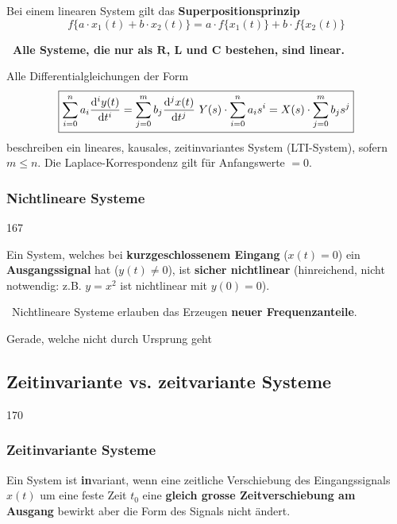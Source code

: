 Bei einem linearen System gilt das \textbf{Superpositionsprinzip} 
$$ \boxed{   f\{a \cdot x_1(t) + b \cdot x_2(t) \} = a \cdot f \{ x_1(t)   \} + b \cdot f \{ x_2(t) \} } $$

\textbf{\textrightarrow\ Alle Systeme, die nur als $\bm{R}$, $\bm{L}$ und $\bm{C}$ bestehen, sind linear.} 

\vspace{0.2cm}

Alle Differentialgleichungen der Form
$$ \boxed{ \sum\limits_{i=0}^n  a_i \frac{\mathop{} \! \mathrm{d}^i y(t) }{\mathop{} \! \mathrm{d} t^i} = \sum\limits_{j=0}^m  b_j \frac{\mathop{} \! \mathrm{d}^j x(t) }{\mathop{} \! \mathrm{d} t^j} \, \relax \, Y(s) \cdot \sum\limits_{i=0}^n a_i s^i = X(s) \cdot \sum\limits_{j=0}^m b_j s^j } $$
beschreiben ein lineares, kausales, zeitinvariantes System (LTI-System), sofern $m \leq n$. Die Laplace-Korrespondenz gilt für Anfangswerte $= 0$.


\subsubsection{Nichtlineare Systeme}{167}

Ein System, welches bei \textbf{kurzgeschlossenem Eingang} ($x(t) = 0$) ein \textbf{Ausgangssignal} hat ($y(t) \neq 0$), 
ist \textbf{sicher nichtlinear} (hinreichend, nicht notwendig: z.B. $y = x^2$ ist nichtlinear mit $y(0) = 0$).

\vspace{0.1cm}

\textrightarrow\  Nichtlineare Systeme erlauben das Erzeugen \textbf{neuer Frequenzanteile}.

\vspace{0.2cm}

\vspace{0.1cm}
Gerade, welche nicht durch Ursprung geht


\subsection{Zeitinvariante vs. zeitvariante Systeme}{170}

\subsubsection{Zeitinvariante Systeme}

Ein System ist \textbf{in}variant, wenn eine zeitliche Verschiebung des Eingangssignals $x(t)$ um eine feste Zeit $t_0$ 
eine \textbf{gleich grosse Zeitverschiebung am Ausgang} bewirkt aber die Form des Signals nicht ändert.

